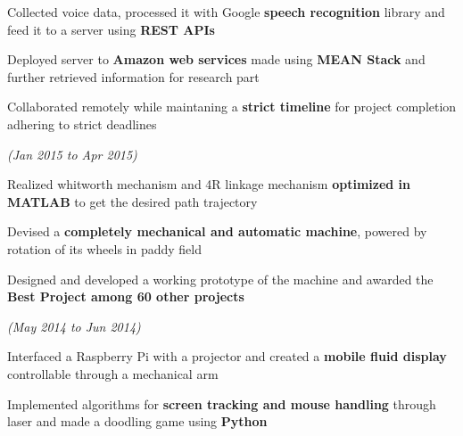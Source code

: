 \documentclass[a4paper]{deedy-resume} %
\begin{document}
\begin{tightitemize}
\item  Collected voice data, processed it with Google \textbf{speech recognition} library and feed it to a server using \textbf{REST APIs}
\item  Deployed server to \textbf{Amazon web services} made using \textbf{MEAN Stack} and further retrieved information for research part
\item  Collaborated remotely while maintaning a \textbf{strict timeline} for project completion adhering to strict deadlines
\microspace

\end{tightitemize}



\hfill {\textit{\small(Jan 2015 to Apr 2015)}}\\
\begin{tightitemize}
\item Realized whitworth mechanism and 4R linkage mechanism \textbf{optimized in MATLAB}  to get the desired path trajectory
\item Devised a \textbf{completely mechanical and automatic machine}, powered by rotation of its wheels in paddy field
\item Designed and developed a working prototype of the machine and awarded the \textbf{Best Project among 60 other projects}
\end{tightitemize}


\microspace

\hfill {\textit{\small(May 2014 to Jun 2014)}}\\

\begin{tightitemize}
\item Interfaced a Raspberry Pi with a projector and created a \textbf{mobile fluid display} controllable through a mechanical arm
\item Implemented algorithms for \textbf{screen tracking and mouse handling} through  laser and made a doodling game using \textbf{Python}
\end{tightitemize}
\sectionspace
\end{document}
